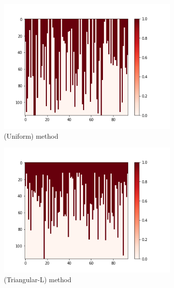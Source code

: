 \documentclass[10pt, conference, compsocconf]{IEEEtran}
\begin{document}
\begin{figure}[h!]
\begin{subfigure}[b]{0.4\linewidth}
  		\includegraphics[width=\columnwidth]{figures/5vs7_diagonal_04_training}
  		\caption{(Uniform) method }
  		\label{fig:Diagonal-Sample-Training-set}
	\end{subfigure}
	\begin{subfigure}[b]{0.4\linewidth}
  		\includegraphics[width=\columnwidth]{figures/5vs7_random-triangular-largest_04_training}
  		\caption{(Triangular-L) method}
  		\label{fig:triangular-L-Sample-Training-set}
	\end{subfigure}
	\begin{subfigure}[b]{0.4\linewidth}

\end{subfigure}
\end{figure}
\end{document}
